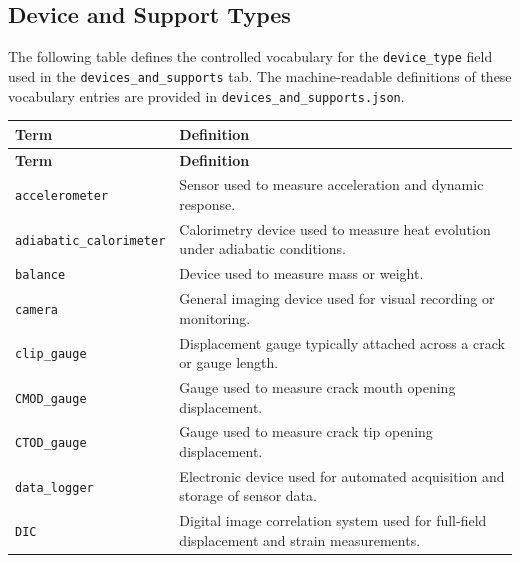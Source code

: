 \documentclass[11pt]{book}
\begin{document}
{\begin{longtable}{p{}p{}}
\hline
\end{longtable}




\subsection{Device and Support Types}
\label{vocab:devices_and_supports_list}

The following table defines the controlled vocabulary for the \texttt{device\_type} field used in the \texttt{devices\_and\_supports} tab. The machine-readable definitions of these vocabulary entries are provided in \texttt{devices\_and\_supports.json}.


\begin{longtable}{p{}p{}}
\hline
\textbf{Term} & \textbf{Definition} \\
\hline
\endfirsthead

\hline
\textbf{Term} & \textbf{Definition} \\
\hline
\endhead

\texttt{accelerometer} &
Sensor used to measure acceleration and dynamic response. \\

\texttt{adiabatic\_calorimeter} &
Calorimetry device used to measure heat evolution under adiabatic conditions. \\

\texttt{balance} &
Device used to measure mass or weight. \\

\texttt{camera} &
General imaging device used for visual recording or monitoring. \\

\texttt{clip\_gauge} &
Displacement gauge typically attached across a crack or gauge length. \\

\texttt{CMOD\_gauge} &
Gauge used to measure crack mouth opening displacement. \\

\texttt{CTOD\_gauge} &
Gauge used to measure crack tip opening displacement. \\

\texttt{data\_logger} &
Electronic device used for automated acquisition and storage of sensor data. \\

\texttt{DIC} &
Digital image correlation system used for full-field displacement and strain measurements. \\


\end{longtable}}
\end{document}
